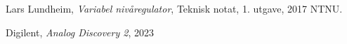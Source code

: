 
    Lars Lundheim,
    \emph{Variabel nivåregulator},
    Teknisk notat,
    1. utgave,
    2017 NTNU.

    Digilent,
    \emph{Analog Discovery 2},
    2023

